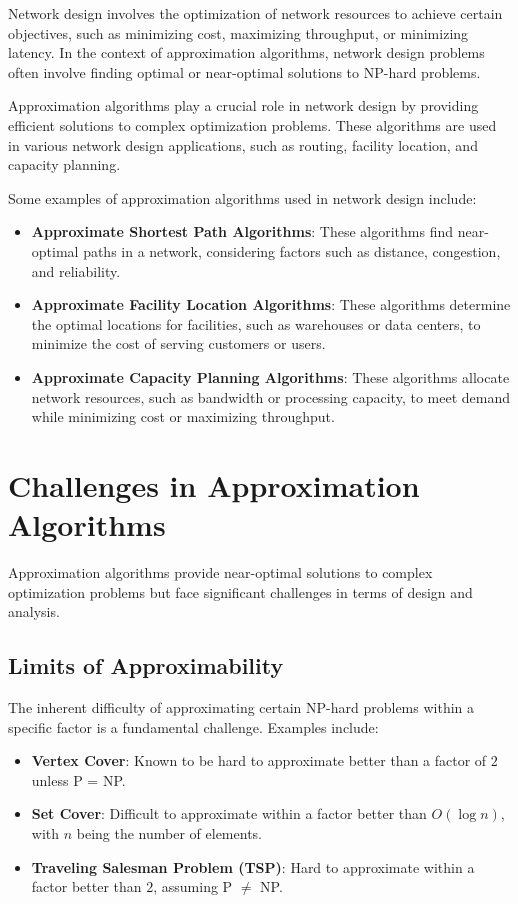 \documentclass[12pt]{book} %
\begin{document}
Network design involves the optimization of network resources to achieve certain objectives, such as minimizing cost, maximizing throughput, or minimizing latency. In the context of approximation algorithms, network design problems often involve finding optimal or near-optimal solutions to NP-hard problems.


Approximation algorithms play a crucial role in network design by providing efficient solutions to complex optimization problems. These algorithms are used in various network design applications, such as routing, facility location, and capacity planning.


Some examples of approximation algorithms used in network design include:

\begin{itemize}
    \item \textbf{Approximate Shortest Path Algorithms}: These algorithms find near-optimal paths in a network, considering factors such as distance, congestion, and reliability.
    \item \textbf{Approximate Facility Location Algorithms}: These algorithms determine the optimal locations for facilities, such as warehouses or data centers, to minimize the cost of serving customers or users.
    \item \textbf{Approximate Capacity Planning Algorithms}: These algorithms allocate network resources, such as bandwidth or processing capacity, to meet demand while minimizing cost or maximizing throughput.
\end{itemize}


\section{Challenges in Approximation Algorithms}

Approximation algorithms provide near-optimal solutions to complex optimization problems but face significant challenges in terms of design and analysis.

\subsection{Limits of Approximability}

The inherent difficulty of approximating certain NP-hard problems within a specific factor is a fundamental challenge. Examples include:

\begin{itemize}
    \item \textbf{Vertex Cover}: Known to be hard to approximate better than a factor of \(2\) unless P = NP.
    \item \textbf{Set Cover}: Difficult to approximate within a factor better than \(O(\log n)\), with \(n\) being the number of elements.
    \item \textbf{Traveling Salesman Problem (TSP)}: Hard to approximate within a factor better than \(2\), assuming P $\neq$ NP.
\end{itemize}
\end{document}
